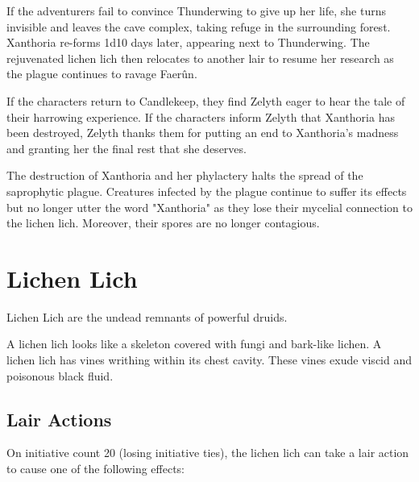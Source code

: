 \documentclass[10pt,a4paper,twoside,bg=print,twocolumn,openany,nodeprecatedcode]{dndbook}
\begin{document}
If the adventurers fail to convince Thunderwing to give up her life, she turns invisible and leaves the cave complex, taking refuge in the surrounding forest. Xanthoria re-forms 1d10 days later, appearing next to Thunderwing. The rejuvenated lichen lich then relocates to another lair to resume her research as the plague continues to ravage Faerûn.

If the characters return to Candlekeep, they find Zelyth eager to hear the tale of their harrowing experience. If the characters inform Zelyth that Xanthoria has been destroyed, Zelyth thanks them for putting an end to Xanthoria's madness and granting her the final rest that she deserves.

The destruction of Xanthoria and her phylactery halts the spread of the saprophytic plague. Creatures infected by the plague continue to suffer its effects but no longer utter the word "Xanthoria" as they lose their mycelial connection to the lichen lich. Moreover, their spores are no longer contagious.

\section{Lichen Lich}
Lichen Lich are the undead remnants of powerful druids.

A lichen lich looks like a skeleton covered with fungi and bark-like lichen. A lichen lich has vines writhing within its chest cavity. These vines exude viscid and poisonous black fluid.

\subsection{Lair Actions}
On initiative count 20 (losing initiative ties), the lichen lich can take a lair action to cause one of the following effects:
\end{document}
